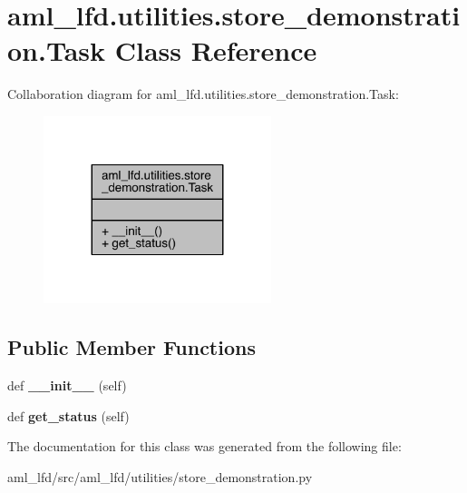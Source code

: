 \hypertarget{classaml__lfd_1_1utilities_1_1store__demonstration_1_1_task}{}\section{aml\+\_\+lfd.\+utilities.\+store\+\_\+demonstration.\+Task Class Reference}
\label{classaml__lfd_1_1utilities_1_1store__demonstration_1_1_task}


Collaboration diagram for aml\+\_\+lfd.\+utilities.\+store\+\_\+demonstration.\+Task\+:\nopagebreak
\begin{figure}[H]
\begin{center}
\leavevmode
\includegraphics[width=188pt]{classaml__lfd_1_1utilities_1_1store__demonstration_1_1_task__coll__graph}
\end{center}
\end{figure}
\subsection*{Public Member Functions}
\begin{DoxyCompactItemize}
\item 
\hypertarget{classaml__lfd_1_1utilities_1_1store__demonstration_1_1_task_a4ce3ad6f8e2d3d6480e835314952b1a1}{}\label{classaml__lfd_1_1utilities_1_1store__demonstration_1_1_task_a4ce3ad6f8e2d3d6480e835314952b1a1} 
def {\bfseries \+\_\+\+\_\+init\+\_\+\+\_\+} (self)
\item 
\hypertarget{classaml__lfd_1_1utilities_1_1store__demonstration_1_1_task_abba6e694b00e75fa26daf543d1a5ab20}{}\label{classaml__lfd_1_1utilities_1_1store__demonstration_1_1_task_abba6e694b00e75fa26daf543d1a5ab20} 
def {\bfseries get\+\_\+status} (self)
\end{DoxyCompactItemize}


The documentation for this class was generated from the following file\+:\begin{DoxyCompactItemize}
\item 
aml\+\_\+lfd/src/aml\+\_\+lfd/utilities/store\+\_\+demonstration.\+py\end{DoxyCompactItemize}
